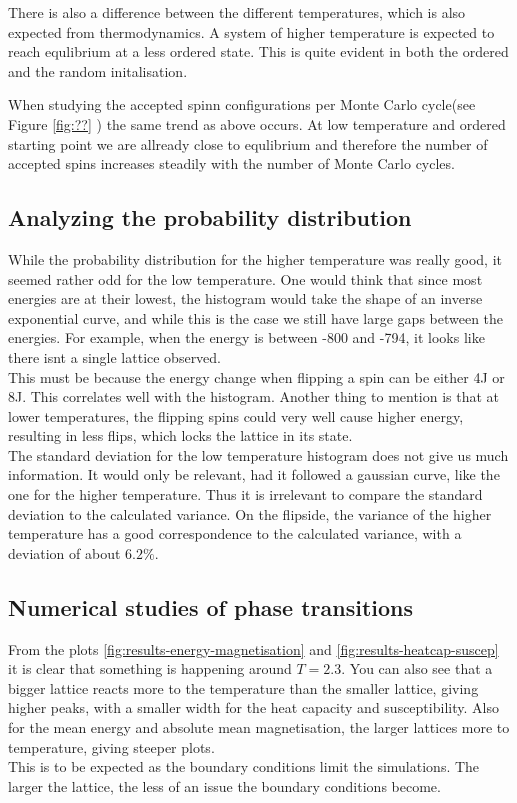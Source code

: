 \documentclass[../main.tex]{subfiles}
\begin{document}
There is also a difference between the different temperatures, which is also expected from thermodynamics. A system of higher temperature is expected to reach equlibrium at a less ordered state. This is quite evident in both the ordered and the random initalisation.

When studying the accepted spinn configurations per Monte Carlo cycle(see Figure \ref{fig:??} ) the same trend as above occurs. At low temperature and ordered starting point we are allready close to equlibrium and therefore the number of accepted spins increases steadily with the number of Monte Carlo cycles.

\subsection{Analyzing the probability distribution}
While the probability distribution for the higher temperature was really good, it seemed rather odd for the low temperature. One would think that since most energies are at their lowest, the histogram would take the shape of an inverse exponential curve, and while this is the case we still have large gaps between the energies. For example, when the energy is between -800 and -794, it looks like there isnt a single lattice observed. \\
This must be because the energy change when flipping a spin can be either 4J or 8J. This correlates well with the histogram. Another thing to mention is that at lower temperatures, the flipping spins could very well cause higher energy, resulting in less flips, which locks the lattice in its state. \\
The standard deviation for the low temperature histogram does not give us much information. It would only be relevant, had it followed a gaussian curve, like the one for the higher temperature. Thus it is irrelevant to compare the standard deviation to the calculated variance. On the flipside, the variance of the higher temperature has a good correspondence to the calculated variance, with a deviation of about $6.2\%$.

\subsection{Numerical studies of phase transitions}
From the plots \ref{fig:results-energy-magnetisation} and \ref{fig:results-heatcap-suscep} it is clear that something is happening around $T = 2.3$. You can also see that a bigger lattice reacts more to the temperature than the smaller lattice, giving higher peaks, with a smaller width for the heat capacity and susceptibility. Also for the mean energy and absolute mean magnetisation, the larger lattices  more to temperature, giving steeper plots.\\
This is to be expected as the boundary conditions limit the simulations. The larger the lattice, the less of an issue the boundary conditions become.
\end{document}
